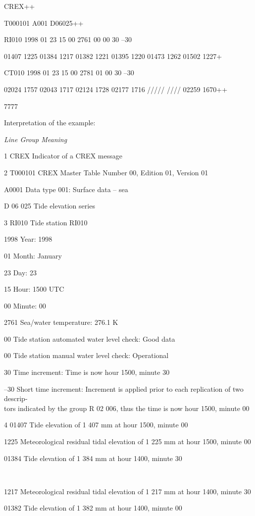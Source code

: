 CREX++

T000101 A001 D06025++

RI010 1998 01 23 15 00 2761 00 00 30 --30

01407 1225 01384 1217 01382 1221 01395 1220 01473 1262 01502 1227+

CT010 1998 01 23 15 00 2781 01 00 30 --30

02024 1757 02043 1717 02124 1728 02177 1716 ///// //// 02259 1670++

7777

Interpretation of the example:

\emph{Line Group Meaning}

1 CREX Indicator of a CREX message

2 T000101 CREX Master Table Number 00, Edition 01, Version 01

A0001 Data type 001: Surface data -- sea

D 06 025 Tide elevation series

3 RI010 Tide station RI010

1998 Year: 1998

01 Month: January

23 Day: 23

15 Hour: 1500 UTC

00 Minute: 00

2761 Sea/water temperature: 276.1 K

00 Tide station automated water level check: Good data

00 Tide station manual water level check: Operational

30 Time increment: Time is now hour 1500, minute 30

--30 Short time increment: Increment is applied prior to each replication of two descrip-\\
tors indicated by the group R 02 006, thus the time is now hour 1500, minute 00

4 01407 Tide elevation of 1 407 mm at hour 1500, minute 00

1225 Meteorological residual tidal elevation of 1 225 mm at hour 1500, minute 00

01384 Tide elevation of 1 384 mm at hour 1400, minute 30

\emph{\textbf{\\
}}

1217 Meteorological residual tidal elevation of 1 217 mm at hour 1400, minute 30

01382 Tide elevation of 1 382 mm at hour 1400, minute 00

